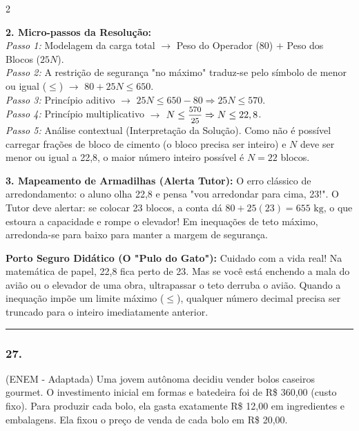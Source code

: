 \begin{multicols*}{2}
\begin{tcolorbox}[colback=CorTitUm!5, colframe=CorTitUm, boxrule=1pt, arc=4pt, left=6pt, right=6pt, top=6pt, bottom=6pt]
    \textbf{2. Micro-passos da Resolução:}\\
    \textit{Passo 1:} Modelagem da carga total $\rightarrow$ Peso do Operador ($80$) $+$ Peso dos Blocos ($25N$).\\
    \textit{Passo 2:} A restrição de segurança "no máximo" traduz-se pelo símbolo de menor ou igual ($\le$) $\rightarrow$ $80 + 25N \le 650$.\\
    \textit{Passo 3:} Princípio aditivo $\rightarrow$ $25N \le 650 - 80 \Rightarrow 25N \le 570$.\\
    \textit{Passo 4:} Princípio multiplicativo $\rightarrow$ $N \le \mfrac{570}{25} \Rightarrow N \le 22,8$.\\
    \textit{Passo 5:} Análise contextual (Interpretação da Solução). Como não é possível carregar frações de bloco de cimento (o bloco precisa ser inteiro) e $N$ deve ser menor ou igual a 22,8, o maior número inteiro possível é $N = 22$ blocos.\par\vspace{0.1cm}
    
    \textbf{3. Mapeamento de Armadilhas (Alerta Tutor):} O erro clássico de arredondamento: o aluno olha 22,8 e pensa "vou arredondar para cima, 23!". O Tutor deve alertar: se colocar 23 blocos, a conta dá $80 + 25(23) = 655 \text{ kg}$, o que estoura a capacidade e rompe o elevador! Em inequações de teto máximo, arredonda-se para baixo para manter a margem de segurança.
    \end{tcolorbox}
    \vspace{0.15cm}
    
    \begin{boxexplicacao}
    \textbf{Porto Seguro Didático (O "Pulo do Gato"):} Cuidado com a vida real! Na matemática de papel, 22,8 fica perto de 23. Mas se você está enchendo a mala do avião ou o elevador de uma obra, ultrapassar o teto derruba o avião. Quando a inequação impõe um limite máximo ($\le$), qualquer número decimal precisa ser truncado para o inteiro imediatamente anterior.
    \end{boxexplicacao}
\fi

\par\vspace{\espacoQuestao}


\noindent\textcolor{CorLinha}{\rule{\linewidth}{0.5pt}} 
\par\vspace{\espacoPreQuestao}
\subsubsection*{27.} 
\begin{enunciadoLiteral}
(ENEM - Adaptada) Uma jovem autônoma decidiu vender bolos caseiros gourmet. O investimento inicial em formas e batedeira foi de R\$ 360,00 (custo fixo). Para produzir cada bolo, ela gasta exatamente R\$ 12,00 em ingredientes e embalagens. Ela fixou o preço de venda de cada bolo em R\$ 20,00.


\end{enunciadoLiteral}
\end{multicols*}

